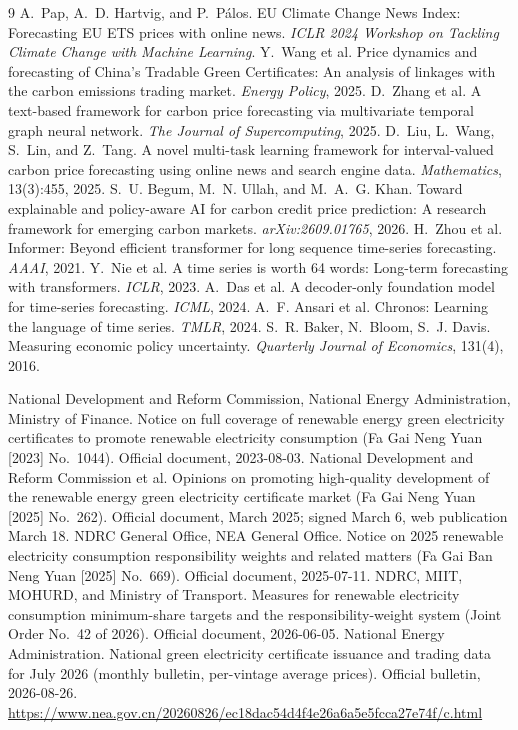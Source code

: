 \documentclass[sigconf,anonymous,review]{acmart}
\begin{document}
\begin{thebibliography}{9}
 A.~Pap, A.~D. Hartvig, and P.~P\'alos. EU Climate Change News Index: Forecasting EU ETS prices with online news. \emph{ICLR 2024 Workshop on Tackling Climate Change with Machine Learning}.
 Y.~Wang et al. Price dynamics and forecasting of China's Tradable Green Certificates: An analysis of linkages with the carbon emissions trading market. \emph{Energy Policy}, 2025.
 D.~Zhang et al. A text-based framework for carbon price forecasting via multivariate temporal graph neural network. \emph{The Journal of Supercomputing}, 2025.
 D.~Liu, L.~Wang, S.~Lin, and Z.~Tang. A novel multi-task learning framework for interval-valued carbon price forecasting using online news and search engine data. \emph{Mathematics}, 13(3):455, 2025.
 S.~U. Begum, M.~N. Ullah, and M.~A.~G. Khan. Toward explainable and policy-aware AI for carbon credit price prediction: A research framework for emerging carbon markets. \emph{arXiv:2609.01765}, 2026.
 H.~Zhou et al. Informer: Beyond efficient transformer for long sequence time-series forecasting. \emph{AAAI}, 2021.
 Y.~Nie et al. A time series is worth 64 words: Long-term forecasting with transformers. \emph{ICLR}, 2023.
 A.~Das et al. A decoder-only foundation model for time-series forecasting. \emph{ICML}, 2024.
 A.~F. Ansari et al. Chronos: Learning the language of time series. \emph{TMLR}, 2024.
 S.~R. Baker, N.~Bloom, S.~J. Davis. Measuring economic policy uncertainty. \emph{Quarterly Journal of Economics}, 131(4), 2016.

 National Development and Reform Commission, National Energy Administration, Ministry of Finance. Notice on full coverage of renewable energy green electricity certificates to promote renewable electricity consumption (Fa Gai Neng Yuan [2023] No.~1044). Official document, 2023-08-03.
 National Development and Reform Commission et al. Opinions on promoting high-quality development of the renewable energy green electricity certificate market (Fa Gai Neng Yuan [2025] No.~262). Official document, March 2025; signed March 6, web publication March 18.
 NDRC General Office, NEA General Office. Notice on 2025 renewable electricity consumption responsibility weights and related matters (Fa Gai Ban Neng Yuan [2025] No.~669). Official document, 2025-07-11.
 NDRC, MIIT, MOHURD, and Ministry of Transport. Measures for renewable electricity consumption minimum-share targets and the responsibility-weight system (Joint Order No.~42 of 2026). Official document, 2026-06-05.
 National Energy Administration. National green electricity certificate issuance and trading data for July 2026 (monthly bulletin, per-vintage average prices). Official bulletin, 2026-08-26. \url{https://www.nea.gov.cn/20260826/ec18dac54d4f4e26a6a5e5fcca27e74f/c.html}
\end{thebibliography}
\end{document}

